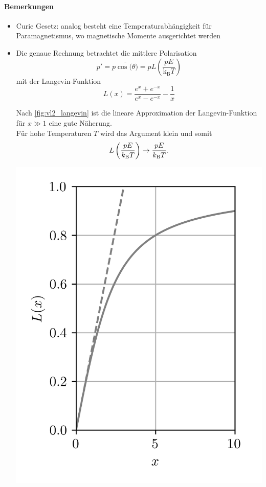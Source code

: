 \paragraph{Bemerkungen}
    \begin{itemize}
    	\item Curie Gesetz: analog besteht eine Temperaturabhängigkeit für Paramagnetismus, wo magnetische Momente ausgerichtet werden
    	\item Die genaue Rechnung betrachtet die mittlere Polarisation
    		$$
    		p' = p \overline{\cos( \theta}) = p L \left( \frac{p E}{ \mathrm{k} _{\mathrm{B}}T} \right) 
    		$$ 
    		mit der Langevin-Funktion
    		$$
    		L\left( x \right) = \frac{e^{x} + e^{-x}}{ e^{x} - e^{-x}}  - \frac{1}{x}
    		$$
            \begin{verbal_sidebyside}[7cm]
                Nach \autoref{fig:vl2_langevin} ist die lineare Approximation der
                Langevin-Funktion für $x\gg1$ eine gute Näherung.\\
                
                Für hohe Temperaturen $T$ wird das Argument klein und somit
                $$L\left(\frac{pE}{k_\text BT}\right) \to \frac{pE}{k_\text BT}.$$
                
                \tcblower
                \centering
                \includegraphics[width=\linewidth]{figures/vl2_langevin.jpg}
                \label{fig:vl2_langevin}
            \end{verbal_sidebyside}
        

\end{itemize}
